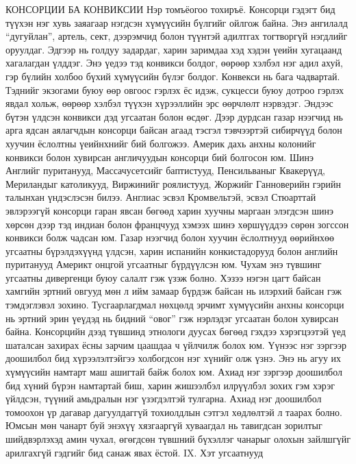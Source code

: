 КОНСОРЦИИ БА КОНВИКСИИ
Нэр томъёогоо тохиръё. Консорци гэдэгт бид түүхэн нэг хувь заяагаар нэгдсэн хүмүүсийн бүлгийг ойлгож байна. Энэ ангилалд “дугуйлан”, артель, сект, дээрэмчид болон түүнтэй адилтгах тогтворгүй нэгдлийг оруулдаг. Эдгээр нь голдуу задардаг, харин заримдаа хэд хэдэн үеийн хугацаанд хагалагдан үлддэг. Энэ үедээ тэд конвикси болдог, өөрөөр хэлбэл нэг адил ахуй, гэр бүлийн холбоо бүхий хүмүүсийн бүлэг болдог. Конвекси нь бага чадвартай. Тэднийг экзогами буюу өөр овгоос гэрлэх ёс идэж, сукцесси буюу дотроо гэрлэх явдал хольж, өөрөөр хэлбэл түүхэн хүрээллийн эрс өөрчлөлт нэрвэдэг. Эндээс бүтэн үлдсэн конвикси дэд угсаатан болон өсдөг. Дээр дурдсан газар нээгчид нь арга ядсан аялагчдын консорци байсан агаад тэсгэл тэвчээртэй сибирчүүд болон хуучин ёслолтны үеийнхнийг бий болгожээ. Америк дахь анхны колонийг конвикси болон хувирсан англичуудын консорци бий болгосон юм. Шинэ Английг пуританууд, Массачусетсийг баптистууд, Пенсильваныг Квакерүүд, Мериландыг католикууд, Виржинийг роялистууд, Жоржийг Ганноверийн гэрийн талынхан үндэслэсэн билээ. Англиас эсвэл Кромвельтэй, эсвэл Стюарттай эвлэрээгүй консорци гаран явсан бөгөөд харин хуучны маргаан элэгдсэн шинэ хөрсөн дээр тэд индиан болон францчууд хэмээх шинэ хөршүүддээ сөрөн зогссон конвикси болж чадсан юм.
Газар нээгчид болон хуучин ёслолтнууд өөрийнхөө угсаатны бүрэлдэхүүнд үлдсэн, харин испанийн конкистадорууд болон английн пуританууд Америкт онцгой угсаатныг бүрдүүлсэн юм. Чухам энэ түвшинг угсаатны дивергенци буюу салалт гэж үзэж болно. Хэзээ нэгэн цагт байсан хамгийн эртний овгууд мөн л ийм замаар бүрдэж байсан нь илэрхий байсан гэж тэмдэглэвэл зохино. Тусгаарлагдмал нөхцөлд эрчимт хүмүүсийн анхны консорци нь эртний эрин үеүдэд нь бидний “овог” гэж нэрлэдэг угсаатан болон хувирсан байна.
Консорцийн дээд түвшинд этнологи дуусах бөгөөд гэхдээ хэрэгцээтэй үед шаталсан захирах ёсны зарчим цаашдаа ч үйлчилж болох юм. Үүнээс нэг зэргээр доошилбол бид хүрээлэлтэйгээ холбогдсон нэг хүнийг олж үзнэ. Энэ нь агуу их хүмүүсийн намтарт маш ашигтай байж болох юм. Ахиад нэг зэргээр доошилбол бид хүний бүрэн намтартай биш, харин жишээлбэл илрүүлбэл зохих гэм хэрэг үйлдсэн, түүний амьдралын нэг үзэгдэлтэй тулгарна. Ахиад нэг доошилбол томоохон үр дагавар дагуулдаггүй тохиолдлын сэтгэл хөдлөлтэй л таарах болно. Юмсын мөн чанарт буй энэхүү хязгааргүй хуваагдал нь тавигдсан зорилтыг шийдвэрлэхэд амин чухал, өгөгдсөн түвшний бүхэллэг чанарыг олохын зайлшгүйг арилгахгүй гэдгийг бид санаж явах ёстой.
IX. Хэт угсаатнууд
